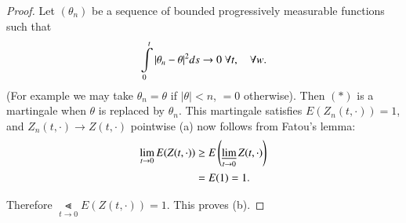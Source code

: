 \begin{proof}
Let $(\theta_{n})$ be a sequence of bounded progressively measurable\break
functions such that
$$
\int\limits^{t}_{0}|\theta_{n}-\theta|^{2}ds\to 0\; \forall t,\quad
\forall w.
$$
(For example we may take $\theta_{n}=\theta$ if $|\theta|<n$, $=0$
otherwise). Then $(*)$ is a martingale when $\theta$ is replaced by
$\theta_{n}$. This martingale satisfies $E(Z_{n}(t,\cdot))=1$, and
$Z_{n}(t,\cdot)\to Z(t,\cdot)$ pointwise (a) now follows from Fatou's
lemma: 
\begin{align*}
\lim\limits_{t\to 0}E(Z(t,\cdot)) & \geq
E\left(\varliminf\limits_{t\to 0}Z(t,\cdot)\right)\\
&= E(1)=1.
\end{align*}

Therefore $\Lt\limits_{t\to 0}E(Z(t,\cdot))=1$. This proves (b).
\end{proof}

